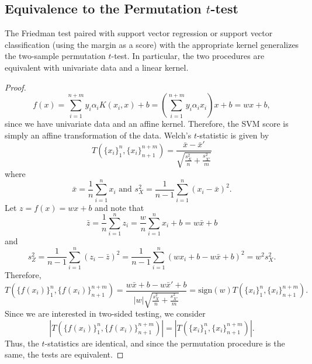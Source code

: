 \subsection{Equivalence to the Permutation $t$-test}
\begin{theorem}
  \label{friedman_equiv}
  The Friedman test paired with support vector regression
  or support vector classification (using the margin as a score)
  with the appropriate kernel generalizes
  the two-sample permutation $t$-test. In particular, the two procedures are
  equivalent with univariate data and a linear kernel.
\end{theorem}

\begin{proof}
  \begin{equation*}
    f(x)=\sum_{i=1}^{n+m} y_i \alpha_iK(x_i,x)+b =
    \left ( \sum_{i=1}^{n+m} y_i \alpha_i x_i \right )x+b = wx+b,
  \end{equation*}
  since we have univariate data and an affine kernel.
  Therefore, the SVM score is simply an affine transformation of the
  data.  Welch's $t$-statistic is given by
  \begin{equation*}
    T(\{x_i\}_1^n,\{x_i\}_{n+1}^{n+m}) = \frac{\bar{x}-\bar{x}'}{\sqrt{\frac{s_X^2}{n}+\frac{s_{X'}^2}{m}}}
  \end{equation*}
  where
  \begin{equation*}
    \bar{x}=\frac{1}{n}\sum_{i=1}^n x_i \text{ and }
    s_X^2= \frac{1}{n-1}\sum_{i=1}^n(x_i-\bar{x})^2.
  \end{equation*}
  Let $z=f(x)=wx+b$ and note that
  \begin{equation*}
    \bar{z}=\frac{1}{n}\sum_{i=1}^{n} z_i = \frac{w}{n}\sum_{i=1}^n x_i
    + b = w\bar{x}+b
  \end{equation*}
  and
  \begin{equation*}
    s_Z^2= \frac{1}{n-1}\sum_{i=1}^n(z_i-\bar{z})^2= \frac{1}{n-1}\sum_{i=1}^n(wx_i+b-w\bar{x}+b)^2=w^2s_X^2.
  \end{equation*}
  Therefore,
  \begin{equation*}
    T(\{f(x_i)\}_1^n,\{f(x_i)\}_{n+1}^{n+m}) =
    \frac{w\bar{x}+b-w\bar{x}'+b}{|w|\sqrt{\frac{s_{X}^2}{n}+\frac{s_{X'}^2}{m}}}
    = \text{sign}(w) T(\{x_i\}_1^n,\{x_i\}_{n+1}^{n+m}).
  \end{equation*}
  Since we are interested in two-sided testing, we consider
  \begin{equation*}
    |T(\{f(x_i)\}_1^n,\{f(x_i)\}_{n+1}^{n+m})| = |T(\{x_i\}_1^n,\{x_i\}_{n+1}^{n+m})|.
  \end{equation*}
  Thus, the $t$-statistics are identical, and since the permutation
  procedure is the same, the tests are equivalent.


\end{proof}
